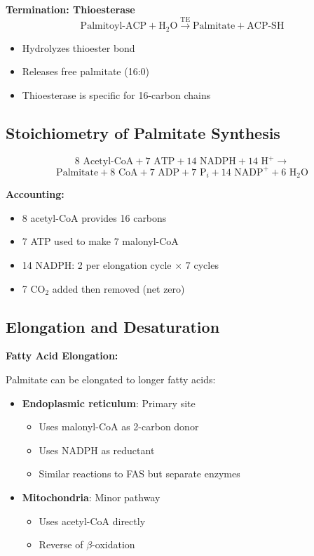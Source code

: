 \textbf{Termination: Thioesterase}
\[
\text{Palmitoyl-ACP} + \text{H}_2\text{O} \xrightarrow{\text{TE}} \text{Palmitate} + \text{ACP-SH}
\]
\begin{itemize}
    \item Hydrolyzes thioester bond
    \item Releases free palmitate (16:0)
    \item Thioesterase is specific for 16-carbon chains
\end{itemize}

\subsection{Stoichiometry of Palmitate Synthesis}

\begin{tcolorbox}[colback=green!5, colframe=green!70!black, title=\textbf{Overall Reaction for Palmitate Synthesis}]
\[
\text{8 Acetyl-CoA} + \text{7 ATP} + \text{14 NADPH} + \text{14 H}^+ \rightarrow
\]
\[
\text{Palmitate} + \text{8 CoA} + \text{7 ADP} + \text{7 P}_i + \text{14 NADP}^+ + \text{6 H}_2\text{O}
\]

\textbf{Accounting:}
\begin{itemize}
    \item 8 acetyl-CoA provides 16 carbons
    \item 7 ATP used to make 7 malonyl-CoA
    \item 14 NADPH: 2 per elongation cycle $\times$ 7 cycles
    \item 7 CO$_2$ added then removed (net zero)
\end{itemize}
\end{tcolorbox}

\subsection{Elongation and Desaturation}

\textbf{Fatty Acid Elongation:}

Palmitate can be elongated to longer fatty acids:

\begin{itemize}
    \item \textbf{Endoplasmic reticulum}: Primary site
    \begin{itemize}
        \item Uses malonyl-CoA as 2-carbon donor
        \item Uses NADPH as reductant
        \item Similar reactions to FAS but separate enzymes
    \end{itemize}
    \item \textbf{Mitochondria}: Minor pathway
    \begin{itemize}
        \item Uses acetyl-CoA directly
        \item Reverse of $\beta$-oxidation
    \end{itemize}
\end{itemize}

